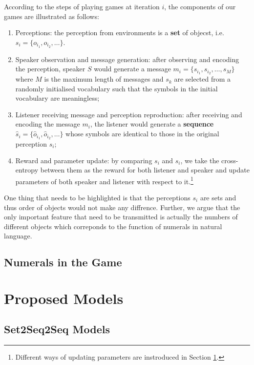 \documentclass[msc,deptreport]{infthesis} %
\begin{document}
According to the steps of playing games at iteration $i$, the components of our games are illustrated as follows:
\begin{enumerate}
  \item Perceptions: the perception from environments is a \textbf{set} of objecst, i.e. $s_i=\{o_{i_1}, o_{i_2}, \dots\}$.
  \item Speaker observation and message generation: after observing and encoding the perception, speaker $S$ would generate a message $m_i=\{s_{i_1}, s_{i_2}, \dots, s_{M}\}$ where $M$ is the maximum length of messages and $s_k$ are selected from a randomly initialised vocabulary such that the symbols in the initial vocabulary are meaningless;
  \item Listener receiving message and perception reproduction: after receiving and encoding the message $m_i$, the listener would generate a \textbf{sequence} $\hat{s}_i = \{\hat{o}_{i_1}, \hat{o}_{i_2}, \dots\}$ whose symbols are identical to those in the original perception $s_i$;
  \item Reward and parameter update: by comparing $s_i$ and $\hat{s}_i$, we take the cross-entropy between them as the reward for both listener and speaker and update parameters of both speaker and listener with respect to it.\footnote{Different ways of updating parameters are instroduced in Section \ref{sec3.2:models}.}
\end{enumerate}

One thing that needs to be highlighted is that the perceptions $s_i$ are sets and thus order of objects would not make any diffrence. Further, we argue that the only important feature that need to be transmitted is actually the numbers of different objects which correponds to the function of numerals in natural language.

\subsection{Numerals in the Game}
\label{ssec3.1.2:numeral_in_game}

\section{Proposed Models}
\label{sec3.2:models}

\subsection{Set2Seq2Seq Models}
\label{ssec3.2.1:set2seq2seq}
\end{document}
